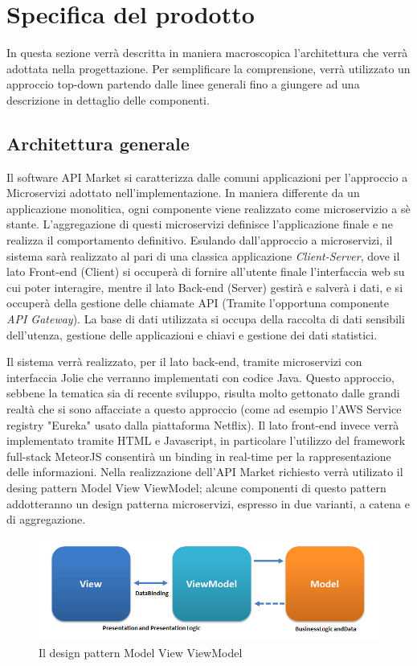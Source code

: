 \newpage
\section{Specifica del prodotto}
In questa sezione verrà descritta in maniera macroscopica l'architettura che verrà adottata nella progettazione. Per semplificare la comprensione, verrà utilizzato un approccio top-down partendo dalle linee generali fino a giungere ad una descrizione in dettaglio delle componenti.

\subsection{Architettura generale}
Il software API Market si caratterizza dalle comuni applicazioni per l'approccio a Microservizi adottato nell'implementazione. In maniera differente da un applicazione monolitica, ogni componente viene realizzato come microservizio a sè stante. L'aggregazione di questi microservizi definisce l'applicazione finale e ne realizza il comportamento definitivo. Esulando dall'approccio a microservizi, il sistema sarà realizzato al pari di una classica applicazione \textit{Client-Server}, dove il lato Front-end (Client) si occuperà di fornire all'utente finale l'interfaccia web su cui poter interagire, mentre il lato Back-end (Server) gestirà e salverà i dati, e si occuperà della gestione delle chiamate API (Tramite l'opportuna componente \textit{API Gateway}). La base di dati utilizzata si occupa della raccolta di dati sensibili dell'utenza, gestione delle applicazioni e chiavi e gestione dei dati statistici.

Il sistema verrà realizzato, per il lato back-end, tramite microservizi con interfaccia Jolie che verranno implementati con codice Java. Questo approccio, sebbene la tematica sia di recente sviluppo, risulta molto gettonato dalle grandi realtà che si sono affacciate a questo approccio (come ad esempio l'AWS Service registry "Eureka" usato dalla piattaforma Netflix). Il lato front-end invece verrà implementato tramite HTML e Javascript, in particolare l'utilizzo del framework full-stack MeteorJS consentirà un binding in real-time per la rappresentazione delle informazioni.
Nella realizzazione dell'API Market richiesto verrà utilizato il desing pattern Model View ViewModel; alcune componenti di questo pattern addotteranno un design patterna microservizi, espresso in due varianti, a catena e di aggregazione.
\begin{figure}[H]
	\centering
	\includegraphics[width=0.7\linewidth]{IMG/MVVMPattern}
	\caption{Il design pattern Model View ViewModel}
\end{figure}

